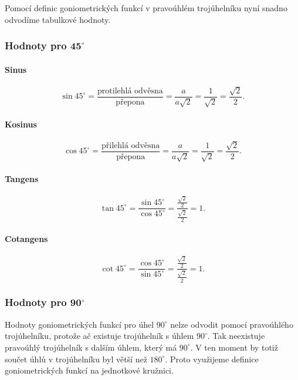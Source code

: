 \documentclass[12pt,a4paper]{article}
\begin{document}
Pomocí definic goniometrických funkcí v pravoúhlém trojúhelníku nyní snadno odvodíme tabulkové hodnoty.

\subsubsection*{Hodnoty pro $\boldsymbol{45^\circ}$}

\paragraph{Sinus}
\[
\sin 45^\circ = \frac{\text{protilehlá odvěsna}}{\text{přepona}}
= \frac{a}{a\sqrt{2}}
= \frac{1}{\sqrt{2}}
= \frac{\sqrt{2}}{2}.
\]

\paragraph{Kosinus}
\[
\cos 45^\circ = \frac{\text{přilehlá odvěsna}}{\text{přepona}}
= \frac{a}{a\sqrt{2}}
= \frac{1}{\sqrt{2}}
= \frac{\sqrt{2}}{2}.
\]

\paragraph{Tangens}
\[
\tan 45^\circ
= \frac{\sin 45^\circ}{\cos 45^\circ}
= \frac{\frac{\sqrt{2}}{2}}{\frac{\sqrt{2}}{2}}
= 1.
\]

\paragraph{Cotangens}
\[
\cot 45^\circ
= \frac{\cos 45^\circ}{\sin 45^\circ}
= \frac{\frac{\sqrt{2}}{2}}{\frac{\sqrt{2}}{2}}
= 1.
\]

\subsubsection*{Hodnoty pro $\boldsymbol{90^\circ}$}

Hodnoty goniometrických funkcí pro úhel $90^\circ$ nelze odvodit pomocí pravoúhlého trojúhelníku,
protože ač existuje trojúhelník s úhlem $90^\circ$. 
Tak neexistuje pravoúhlý trojúhelník s dalším úhlem, který má $90^\circ$. V ten moment by totiž součet úhlů v trojúhelníku byl větší než $180^\circ$.
Proto využijeme definice goniometrických funkcí na jednotkové kružnici.
\end{document}
